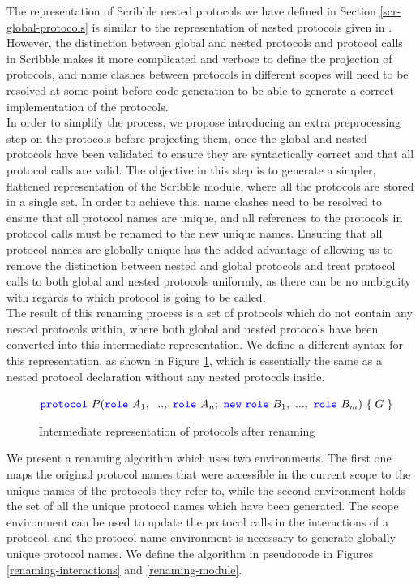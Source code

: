 \documentclass[12pt,twoside]{report}
\begin{document}
The representation of Scribble nested protocols we have defined in Section \ref{scr-global-protocols} is similar to the representation of nested protocols given in \cite{nestedprotocols}. However, the distinction between global and nested protocols and protocol calls in Scribble makes it more complicated and verbose to define the projection of protocols, and name clashes between protocols in different scopes will need to be resolved at some point before code generation to be able to generate a correct implementation of the protocols.\\

In order to simplify the process, we propose introducing an extra preprocessing step on the protocols before projecting them, once the global and nested protocols have been validated to ensure they are syntactically correct and that all protocol calls are valid. The objective in this step is to generate a simpler, flattened representation of the Scribble module, where all the protocols are stored in a single set. In order to achieve this, name clashes need to be resolved to ensure that all protocol names are unique, and all references to the protocols in protocol calls must be renamed to the new unique names. Ensuring that all protocol names are globally unique has the added advantage of allowing us to remove the distinction between nested and global protocols and treat protocol calls to both global and nested protocols uniformly, as there can be no ambiguity with regards to which protocol is going to be called.\\

The result of this renaming process is a set of protocols which do not contain any nested protocols within, where both global and nested protocols have been converted into this intermediate representation. We define a different syntax for this representation, as shown in Figure \ref{protocols-after-renaming}, which is essentially the same as a nested protocol declaration without any nested protocols inside.\\

\begin{figure}[h!]
    \centering
    $\protocol\ P(\role\ A_1,\ ...,\ \role\ A_n;\ \scrnew\ \role\ B_1,\ ...,\ \role\ B_m)\ \{\;G\;\}$\\
    \caption{Intermediate representation of protocols after renaming}
    \label{protocols-after-renaming}
\end{figure}

We present a renaming algorithm which uses two environments. The first one maps the original protocol names that were accessible in the current scope to the unique names of the protocols they refer to, while the second environment holds the set of all the unique protocol names which have been generated. The scope environment can be used to update the protocol calls in the interactions of a protocol, and the protocol name environment is necessary to generate globally unique protocol names. We define the algorithm in pseudocode in Figures \ref{renaming-interactions} and \ref{renaming-module}.
\end{document}
